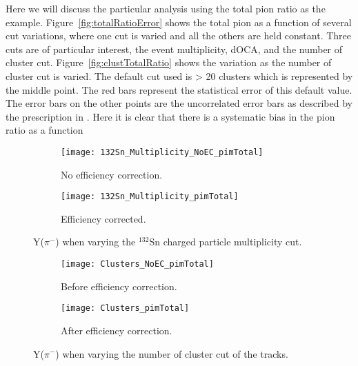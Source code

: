 Here we will discuss the particular analysis using the total pion ratio as the example. Figure~\ref{fig:totalRatioError} shows the total pion as a function of several cut variations, where one cut is varied and all the others are held constant. Three cuts are of particular interest, the event multiplicity, dOCA, and the number of cluster cut. Figure~\ref{fig:clustTotalRatio} shows the variation as the number of cluster cut is varied. The default cut used is > 20 clusters which is represented by the middle point. The red bars represent the statistical error of this default value. The error bars on the other points are the uncorrelated error bars as described by the prescription in \cite{dataAnalysis}. Here it is clear that there is a systematic bias in the pion ratio as a function 



\begin{figure}[!htb]
     \centering
     \begin{subfigure}[b]{\textwidth}
         \centering
         \texttt{[image: 132Sn\_Multiplicity\_NoEC\_pimTotal]}
         \caption{No efficiency correction.}
         \label{fig:multCutVar}
     \end{subfigure}
     \hfill
    \begin{subfigure}[b]{\textwidth}
         \centering
         \texttt{[image: 132Sn\_Multiplicity\_pimTotal]}
         \caption{Efficiency corrected.}
         \label{fig:multCutVar}
     \end{subfigure}
     \hfill
\caption{Y($\pi^-$) when varying the ${}^{132}$Sn charged particle multiplicity cut. }
\label{fig:cutVar}
\end{figure}



\begin{figure}[!htb]
     \centering
     \begin{subfigure}[b]{\textwidth}
         \centering
         \texttt{[image: Clusters\_NoEC\_pimTotal]}
         \caption{Before efficiency correction.}
         \label{fig:pim_clustVar_NoEC}
     \end{subfigure}
     \hfill
    \begin{subfigure}[b]{\textwidth}
         \centering
         \texttt{[image: Clusters\_pimTotal]}
         \caption{After efficiency correction.}
         \label{fig:pim_clustVar_EC}
     \end{subfigure}
     \hfill
\caption{Y($\pi^-$) when varying the number of cluster cut of the tracks.}
\label{fig:pim_clustVar}
\end{figure}




